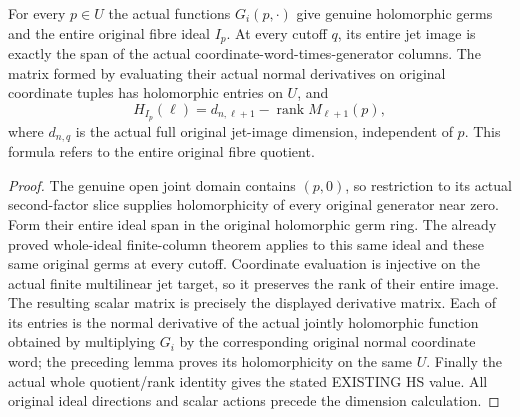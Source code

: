 \begin{theorem}
\label{hir:actual-holomorphic-family-whole-fibre-macaulay-dictionary}
\leanok
{}
For every $p\in U$ the actual functions $G_i(p,\cdot)$ give genuine
holomorphic germs and the entire original fibre ideal $I_p$. At every
cutoff $q$, its entire jet image is exactly the span of the actual
coordinate-word-times-generator columns. The matrix formed by evaluating
their actual normal derivatives on original coordinate tuples has
holomorphic entries on $U$, and
\[
 H_{I_p}(\ell)=d_{n,\ell+1}-\operatorname{rank}M_{\ell+1}(p),
\]
where $d_{n,q}$ is the actual full original jet-image dimension, independent
of $p$. This formula refers to the entire original fibre quotient.
\end{theorem}
\begin{proof}
The genuine open joint domain contains $(p,0)$, so restriction to its actual
second-factor slice supplies holomorphicity of every original generator
near zero. Form their entire ideal span in the original holomorphic germ
ring. The already proved whole-ideal finite-column theorem applies to this
same ideal and these same original germs at every cutoff. Coordinate
evaluation is injective on the actual finite multilinear jet target, so
it preserves the rank of their entire image. The resulting scalar matrix
is precisely the displayed derivative matrix. Each of its entries is the
normal derivative of the actual jointly holomorphic function obtained
by multiplying $G_i$ by the corresponding original normal coordinate word;
the preceding lemma proves its holomorphicity on the same $U$. Finally the
actual whole quotient/rank identity gives the stated EXISTING HS value.
All original ideal directions and scalar actions precede the dimension
calculation.
\end{proof}

